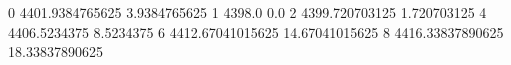 0 4401.9384765625 3.9384765625
1 4398.0 0.0
2 4399.720703125 1.720703125
4 4406.5234375 8.5234375
6 4412.67041015625 14.67041015625
8 4416.33837890625 18.33837890625
